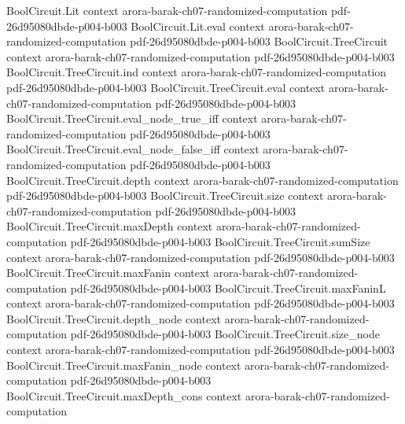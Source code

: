 \begin{theorem}
\label{Randomized.PRIMESBin_mem_BPP_PTM}
\leanok
{}
\proofstep
  {BoolCircuit.Lit}
  {context}
  {arora-barak-ch07-randomized-computation}
  {pdf-26d95080dbde-p004-b003}
\proofstep
  {BoolCircuit.Lit.eval}
  {context}
  {arora-barak-ch07-randomized-computation}
  {pdf-26d95080dbde-p004-b003}
\proofstep
  {BoolCircuit.TreeCircuit}
  {context}
  {arora-barak-ch07-randomized-computation}
  {pdf-26d95080dbde-p004-b003}
\proofstep
  {BoolCircuit.TreeCircuit.ind}
  {context}
  {arora-barak-ch07-randomized-computation}
  {pdf-26d95080dbde-p004-b003}
\proofstep
  {BoolCircuit.TreeCircuit.eval}
  {context}
  {arora-barak-ch07-randomized-computation}
  {pdf-26d95080dbde-p004-b003}
\proofstep
  {BoolCircuit.TreeCircuit.eval_node_true_iff}
  {context}
  {arora-barak-ch07-randomized-computation}
  {pdf-26d95080dbde-p004-b003}
\proofstep
  {BoolCircuit.TreeCircuit.eval_node_false_iff}
  {context}
  {arora-barak-ch07-randomized-computation}
  {pdf-26d95080dbde-p004-b003}
\proofstep
  {BoolCircuit.TreeCircuit.depth}
  {context}
  {arora-barak-ch07-randomized-computation}
  {pdf-26d95080dbde-p004-b003}
\proofstep
  {BoolCircuit.TreeCircuit.size}
  {context}
  {arora-barak-ch07-randomized-computation}
  {pdf-26d95080dbde-p004-b003}
\proofstep
  {BoolCircuit.TreeCircuit.maxDepth}
  {context}
  {arora-barak-ch07-randomized-computation}
  {pdf-26d95080dbde-p004-b003}
\proofstep
  {BoolCircuit.TreeCircuit.sumSize}
  {context}
  {arora-barak-ch07-randomized-computation}
  {pdf-26d95080dbde-p004-b003}
\proofstep
  {BoolCircuit.TreeCircuit.maxFanin}
  {context}
  {arora-barak-ch07-randomized-computation}
  {pdf-26d95080dbde-p004-b003}
\proofstep
  {BoolCircuit.TreeCircuit.maxFaninL}
  {context}
  {arora-barak-ch07-randomized-computation}
  {pdf-26d95080dbde-p004-b003}
\proofstep
  {BoolCircuit.TreeCircuit.depth_node}
  {context}
  {arora-barak-ch07-randomized-computation}
  {pdf-26d95080dbde-p004-b003}
\proofstep
  {BoolCircuit.TreeCircuit.size_node}
  {context}
  {arora-barak-ch07-randomized-computation}
  {pdf-26d95080dbde-p004-b003}
\proofstep
  {BoolCircuit.TreeCircuit.maxFanin_node}
  {context}
  {arora-barak-ch07-randomized-computation}
  {pdf-26d95080dbde-p004-b003}
\proofstep
  {BoolCircuit.TreeCircuit.maxDepth_cons}
  {context}
  {arora-barak-ch07-randomized-computation}

\end{theorem}
